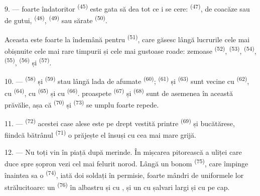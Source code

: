 9. ---  foarte îndatoritor \textsuperscript{(45)} este gata să
dea tot ce i se cere:  \textsuperscript{(47)}, de coacăze sau de
gutui,  \textsuperscript{(48)}, 
\textsuperscript{(49)} sau  sărate \textsuperscript{(50)}.

Aceasta este foarte la îndemână pentru 
\textsuperscript{(51)}, care găsesc lângă lucrurile cele mai obișnuite cele mai rare
timpurii și cele mai gustoase roade:  zemoase \textsuperscript{(52)},
 \textsuperscript{(53)},  \textsuperscript{(54)},
 \textsuperscript{(55)},  \textsuperscript{(56)} și
 \textsuperscript{(57)}.

\VUsaut{4.0mm}
\VUsaut{3.0mm}

10. ---  \textsuperscript{(58)} și 
\textsuperscript{(59)} stau lângă lada de  afumate
\textsuperscript{(60)};  \textsuperscript{(61)} și
 \textsuperscript{(63)} sunt vecine cu 
\textsuperscript{(62)}, cu  \textsuperscript{(64)}, cu
 \textsuperscript{(65)} și cu 
\textsuperscript{(66)}.  proaspete \textsuperscript{(67)} și
 \textsuperscript{(68)} sunt de asemenea în această prăvălie, așa
că  \textsuperscript{(70)} și 
\textsuperscript{(73)} se umplu foarte repede.

11. ---  \textsuperscript{(72)} acestei case alese este pe drept
vestită printre  \textsuperscript{(69)} și bucătărese, fiindcă
bătrânul  \textsuperscript{(71)} o prăjește el însuși cu cea mai mare
grijă.

\VUsaut{4.0mm}
\VUsaut{3.0mm}

12. --- Nu toți vin în piață după merinde. În mișcarea pitorească a uliței care duce
spre șopron vezi cel mai felurit norod. Lângă un 
bonom \textsuperscript{(75)}, care împinge înaintea sa o 
\textsuperscript{(74)}, iată doi soldați în permisie, foarte mândri de uniformele
lor strălucitoare: un  \textsuperscript{(76)} în 
albastru și cu , și un  cu
șalvari largi și cu  pe cap.

